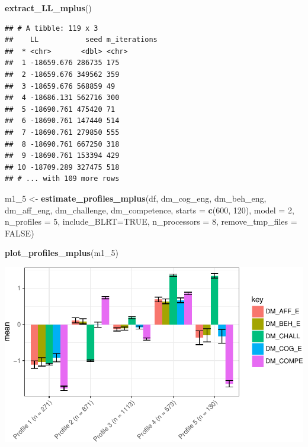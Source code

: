 \documentclass[]{book}
\newenvironment{Shaded}{\begin{snugshade}}{\end{snugshade}}
\newcommand{\KeywordTok}[1]{\textcolor[rgb]{0.13,0.29,0.53}{\textbf{#1}}}
\newcommand{\DataTypeTok}[1]{\textcolor[rgb]{0.13,0.29,0.53}{#1}}
\newcommand{\DecValTok}[1]{\textcolor[rgb]{0.00,0.00,0.81}{#1}}
\newcommand{\StringTok}[1]{\textcolor[rgb]{0.31,0.60,0.02}{#1}}
\newcommand{\OtherTok}[1]{\textcolor[rgb]{0.56,0.35,0.01}{#1}}
\newcommand{\NormalTok}[1]{#1}
\begin{document}
\begin{Shaded}
\begin{Highlighting}[]
\KeywordTok{extract_LL_mplus}\NormalTok{()}
\end{Highlighting}
\end{Shaded}

\begin{verbatim}
## # A tibble: 119 x 3
##    LL           seed m_iterations
##  * <chr>       <dbl> <chr>       
##  1 -18659.676 286735 175         
##  2 -18659.676 349562 359         
##  3 -18659.676 568859 49          
##  4 -18686.131 562716 300         
##  5 -18690.761 475420 71          
##  6 -18690.761 147440 514         
##  7 -18690.761 279850 555         
##  8 -18690.761 667250 318         
##  9 -18690.761 153394 429         
## 10 -18709.289 327475 518         
## # ... with 109 more rows
\end{verbatim}

\begin{Shaded}
\begin{Highlighting}[]
\NormalTok{m1_}\DecValTok{5}\NormalTok{ <-}\StringTok{ }\KeywordTok{estimate_profiles_mplus}\NormalTok{(df,  }
\NormalTok{                             dm_cog_eng, dm_beh_eng, dm_aff_eng, dm_challenge, dm_competence,}
                             \DataTypeTok{starts =} \KeywordTok{c}\NormalTok{(}\DecValTok{600}\NormalTok{, }\DecValTok{120}\NormalTok{),}
                             \DataTypeTok{model =} \DecValTok{2}\NormalTok{,}
                             \DataTypeTok{n_profiles =} \DecValTok{5}\NormalTok{,}
                             \DataTypeTok{include_BLRT=}\OtherTok{TRUE}\NormalTok{,}
                             \DataTypeTok{n_processors =} \DecValTok{8}\NormalTok{, }\DataTypeTok{remove_tmp_files =} \OtherTok{FALSE}\NormalTok{)}

\KeywordTok{plot_profiles_mplus}\NormalTok{(m1_}\DecValTok{5}\NormalTok{)}
\end{Highlighting}
\end{Shaded}

\includegraphics{rosenberg-dissertation_files/figure-latex/spec-solutions-model2-5-1.pdf}
\end{document}
